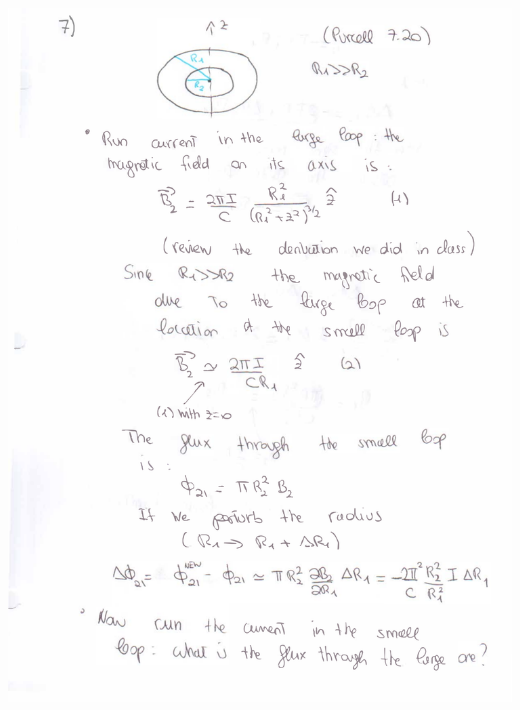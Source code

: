 \documentclass[makesolutionspdf]{esg8022pset}
\begin{document}
\begin{solution}
  \begin{center}
    \includegraphics[width = \textwidth, height = 0.9\textheight, keepaspectratio]{ps9_7a}
    \clearpage

\end{center}
\end{solution}
\end{document}
